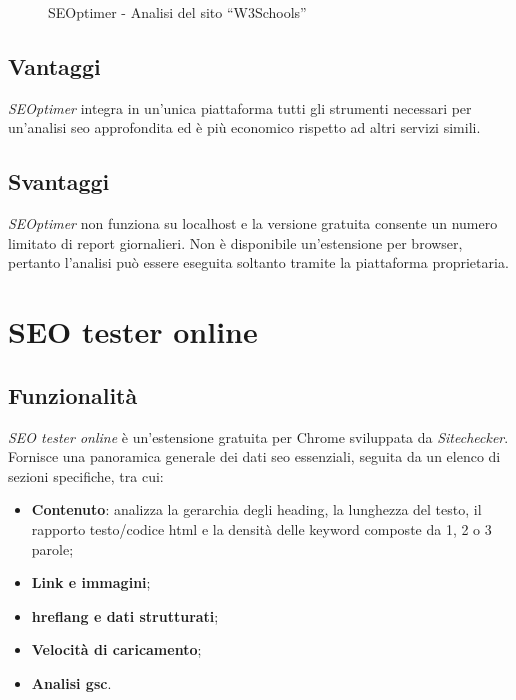 \begin{figure}[H]
    \centering 
    \caption{SEOptimer - Analisi del sito “W3Schools”}
\end{figure}

\subsection{Vantaggi}
\par \textit{SEOptimer} integra in un'unica piattaforma tutti gli strumenti necessari per un'analisi \gls{seo} approfondita ed è più economico rispetto ad altri servizi simili.

\subsection{Svantaggi}
\par \textit{SEOptimer} non funziona su \gls{localhost} e la versione gratuita consente un numero limitato di report giornalieri. Non è disponibile un'estensione per browser, pertanto l'analisi può essere eseguita soltanto tramite la piattaforma proprietaria.

\section{SEO tester online}

\subsection{Funzionalità}
\par \textit{SEO tester online} è un'estensione gratuita per Chrome sviluppata da \textit{Sitechecker}. Fornisce una panoramica generale dei dati \gls{seo} essenziali, seguita da un elenco di sezioni specifiche, tra cui:
\begin{itemize}
    \item \textbf{Contenuto}: analizza la gerarchia degli heading, la lunghezza del testo, il rapporto testo/codice \gls{html} e la densità delle keyword composte da 1, 2 o 3 parole;
    \item \textbf{Link e immagini};
    \item \textbf{\Gls{hreflang} e dati strutturati};
    \item \textbf{Velocità di caricamento};
    \item \textbf{Analisi \gls{gsc}}.
\end{itemize}

